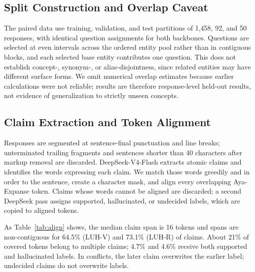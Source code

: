 \documentclass[conference,a4paper]{IEEEtran}
\begin{document}
\subsection{Split Construction and Overlap Caveat}
\label{sec:split}
The paired data use training, validation, and test partitions of 1,458, 92, and 50 responses, with identical question assignments for both backbones. Questions are selected at even intervals across the ordered entity pool rather than in contiguous blocks, and each selected base entity contributes one question. This does not establish concept-, synonym-, or alias-disjointness, since related entities may have different surface forms. We omit numerical overlap estimates because earlier calculations were not reliable; results are therefore response-level held-out results, not evidence of generalization to strictly unseen concepts.

\subsection{Claim Extraction and Token Alignment}
\label{sec:align}
Responses are segmented at sentence-final punctuation and line breaks; unterminated trailing fragments and sentences shorter than 40 characters after markup removal are discarded. DeepSeek-V4-Flash extracts atomic claims and identifies the words expressing each claim. We match those words greedily and in order to the sentence, create a character mask, and align every overlapping Aya-Expanse token. Claims whose words cannot be aligned are discarded; a second DeepSeek pass assigns supported, hallucinated, or undecided labels, which are copied to aligned tokens.

As Table~\ref{tab:align} shows, the median claim span is 16 tokens and spans are non-contiguous for 64.5\% (LUH-V) and 73.1\% (LUH-R) of claims. About 21\% of covered tokens belong to multiple claims; 4.7\% and 4.6\% receive both supported and hallucinated labels. In conflicts, the later claim overwrites the earlier label; undecided claims do not overwrite labels.
\end{document}
